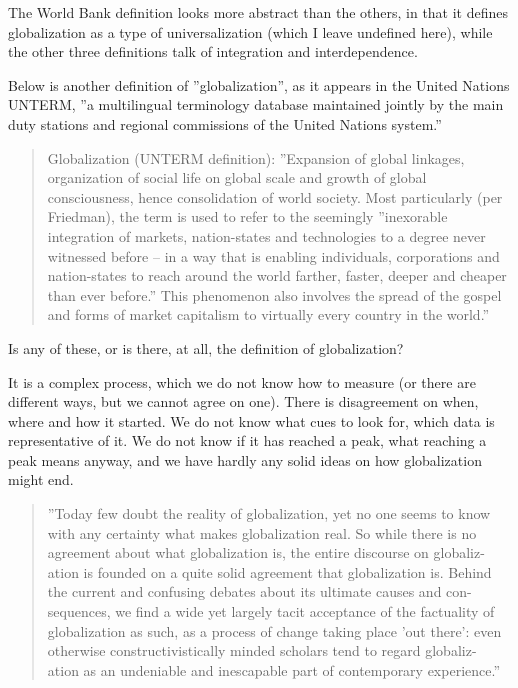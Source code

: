The World Bank definition looks more abstract than the others, in that it defines globalization as a type of universalization (which I leave undefined here), while the other three definitions talk of integration and interdependence.

Below is another definition of ''globalization'', as it appears in the United Nations UNTERM, ''a multilingual terminology database maintained jointly by the main duty stations and regional commissions of the United Nations system.''

\begin{quote}
Globalization (UNTERM definition): ''Expansion of global linkages, organization of social life on global scale and growth of global consciousness, hence consolidation of world society. Most particularly (per Friedman), the term is used to refer to the seemingly ''inexorable integration of markets, nation-states and technologies to a degree never witnessed before -- in a way that is enabling individuals, corporations and nation-states to reach around the world farther, faster, deeper and cheaper than ever before.'' This phenomenon also involves the spread of the gospel and forms of market capitalism to virtually every country in the world.'' \cite{unterm-globalization}
\end{quote}

Is any of these, or is there, at all, the definition of globalization?

It is a complex process, which we do not know how to measure (or there are different ways, but we cannot agree on one). There is disagreement on when, where and how it started. We do not know what cues to look for, which data is representative of it. We do not know if it has reached a peak, what reaching a peak means anyway, and we have hardly any solid ideas on how globalization might end.

\begin{quote}
''Today few doubt the reality of globalization, yet no one seems to know with any certainty what makes globalization real. So while there is no agreement about what globalization is, the entire discourse on globaliz- ation is founded on a quite solid agreement that globalization is. Behind the current and confusing debates about its ultimate causes and con- sequences, we find a wide yet largely tacit acceptance of the factuality of globalization as such, as a process of change taking place 'out there': even otherwise constructivistically minded scholars tend to regard globaliz- ation as an undeniable and inescapable part of contemporary experience.'' \cite{bartelson2000three}
\end{quote}

